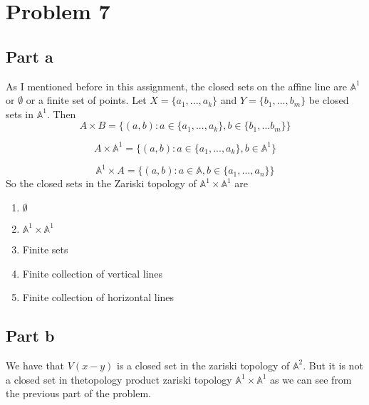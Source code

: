 \documentclass[12pt]{article}
\begin{document}
\clearpage 
\section*{Problem 7}
\subsection*{Part a}
As I mentioned before in this assignment, the closed sets on the affine line are $\mathbb{A}^1$ or $\emptyset$ or a finite set of points. Let $X=\{a_1,...,a_k\}$ and $Y=\{b_1,...,b_m\}$ be closed sets in $\mathbb{A}^1$. 
Then 
$$A \times B = \{(a,b): a \in \{a_1,...,a_k\}, b \in \{b_1,...b_m\} \}$$ 

$$A \times \mathbb{A}^1  = \{(a,b): a \in \{a_1,...,a_k\}, b \in \mathbb{A}^1 \}$$ 

$$ \mathbb{A}^1 \times A  = \{(a,b): a \in \mathbb{A}, b \in \{a_1,...,a_n\} \}$$
So the closed sets in the Zariski topology of $\mathbb{A}^1 \times \mathbb{A}^1$ are
\begin{enumerate}
\item $\emptyset$
\item $\mathbb{A}^1 \times \mathbb{A}^1$
\item Finite sets
\item Finite collection of vertical lines
\item Finite collection of horizontal lines
\end{enumerate}
\subsection*{Part b}
We have that $V(x-y)$ is a closed set in the zariski topology of $\mathbb{A}^2$. But it is not a closed set in thetopology product zariski topology $\mathbb{A}^1 \times \mathbb{A}^1$ as we can see from the previous part of the problem.
\end{document}

